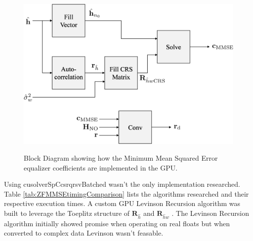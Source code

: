 \begin{figure}
	\caption{Block Diagram showing how the Minimum Mean Squared Error equalizer coefficients are implemented in the GPU.}
	\centering\includegraphics[width=7.98in/100*55]{figures/eq_GPUimplementation/blockMMSE.pdf}
	\label{fig:blockMMSE}
\end{figure}

Using cusolverSpCcsrqrsvBatched wasn't the only implementation researched.
Table \ref{tab:ZFMMSEtimingComparison} lists the algorithms researched and their respective execution times.
A custom GPU Levinson Recursion algorithm was built to leverage the Toeplitz structure of $\mathbf{R}_{\hat{h}}$ and $\mathbf{R}_{\hat{h}w}$ \cite[Chap. 5]{hayes:1996}. 
The Levinson Recursion algorithm initially showed promise when operating on real floats but when converted to complex data Levinson wasn't feasable.

